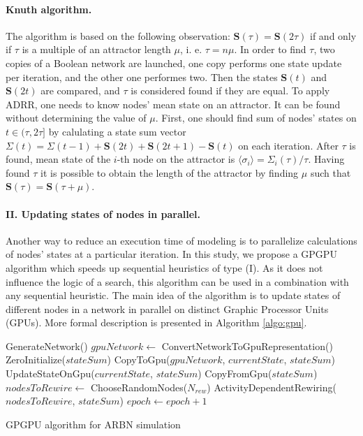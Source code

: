 \documentclass[procedia]{easychair}
\begin{document}
	\paragraph{Knuth algorithm.} The algorithm is based on the following observation: $\mathbf{S}(\tau) = \mathbf{S}(2\tau)$ if and only if $\tau$ is a multiple of an attractor length $\mu$, i. e. $\tau = n\mu$. In order to find $\tau$, two copies of a Boolean network are launched, one copy performs one state update per iteration, and the other one performes two. Then the states $\mathbf{S}(t)$ and $\mathbf{S}(2t)$ are compared, and $\tau$ is considered found if they are equal. To apply ADRR, one needs to know nodes' mean state on an attractor. It can be found without determining the value of $\mu$. First, one should find sum of nodes' states on $t \in (\tau, 2\tau]$ by calulating a state sum vector $\Sigma(t) = \Sigma(t - 1) + \mathbf{S}(2t) + \mathbf{S}(2t + 1) - \mathbf{S}(t)$ on each iteration. After $\tau$ is found, mean state of the $i$-th node on the attractor is $\langle\sigma_i\rangle = \Sigma_i(\tau) / \tau$. Having found $\tau$ it is possible to obtain the length of the attractor by finding $\mu$ such that $\mathbf{S}(\tau) = \mathbf{S}(\tau + \mu)$.

\paragraph{II. Updating states of nodes in parallel.} Another way to reduce an execution time of modeling is to parallelize calculations of nodes' states at a particular iteration. In this study, we propose a GPGPU algorithm which speeds up sequential heuristics of type (I). As it does not influence the logic of a search, this algorithm can be used in a combination with any sequential heuristic. The main idea of the algorithm is to update states of different nodes in a network in parallel on distinct Graphic Processor Units (GPUs). More formal description is presented in Algorithm \ref{algo:gpu}.

	\begin{algorithm}[ht!]
		\label{algo:gpu}
		GenerateNetwork()\;
		{
			$gpuNetwork \leftarrow$ ConvertNetworkToGpuRepresentation()\;
			ZeroInitialize($stateSum$)\;
			CopyToGpu($gpuNetwork$, $currentState$, $stateSum$)\;
			{ 	
				UpdateStateOnGpu($currentState$, $stateSum$)\;
			}
			CopyFromGpu($stateSum$)\;
			$nodesToRewire \leftarrow$ ChooseRandomNodes($N_{rew}$)\;
			ActivityDependentRewiring($nodesToRewire$, $stateSum$)\;
			$epoch \leftarrow  epoch + 1$\;
		}
		\caption{GPGPU algorithm for ARBN simulation}
	\end{algorithm}
\end{document}
